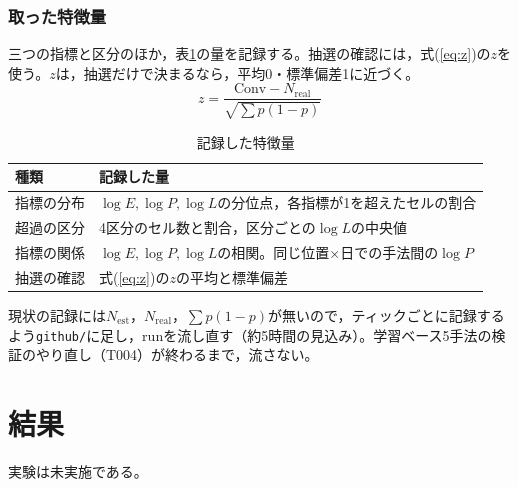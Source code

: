 \documentclass[twocolumn, 10pt]{ujarticle}
\newcommand{\Nest}{N_{\mathrm{est}}}
\newcommand{\Nreal}{N_{\mathrm{real}}}
\newcommand{\Conv}{\mathrm{Conv}}
\begin{document}
\subsubsection{取った特徴量}\label{sec:e-feat}

三つの指標と区分のほか，表\ref{tab:feat}の量を記録する。抽選の確認には，式(\ref{eq:z})の$z$を使う。$z$は，抽選だけで決まるなら，平均0・標準偏差1に近づく。
\begin{equation}
z=\frac{\Conv-\Nreal}{\sqrt{\sum p(1-p)}}
\label{eq:z}
\end{equation}

\begin{table}[H]
\centering
\caption{記録した特徴量}
\label{tab:feat}
\small
\begin{tabularx}{\linewidth}{@{}l>{\raggedright\arraybackslash}X@{}}
\toprule
種類 & 記録した量 \\
\midrule
指標の分布 & $\log E,\log P,\log L$の分位点，各指標が1を超えたセルの割合 \\
超過の区分 & 4区分のセル数と割合，区分ごとの$\log L$の中央値 \\
指標の関係 & $\log E,\log P,\log L$の相関。同じ位置×日での手法間の$\log P$ \\
抽選の確認 & 式(\ref{eq:z})の$z$の平均と標準偏差 \\
\bottomrule
\end{tabularx}
\end{table}

現状の記録には$\Nest$，$\Nreal$，$\sum p(1-p)$が無いので，ティックごとに記録するよう\texttt{github/}に足し，runを流し直す（約5時間の見込み）。学習ベース5手法の検証のやり直し（T004）が終わるまで，流さない。

\section{結果}\label{sec:e-result}

実験は未実施である。
\end{document}
